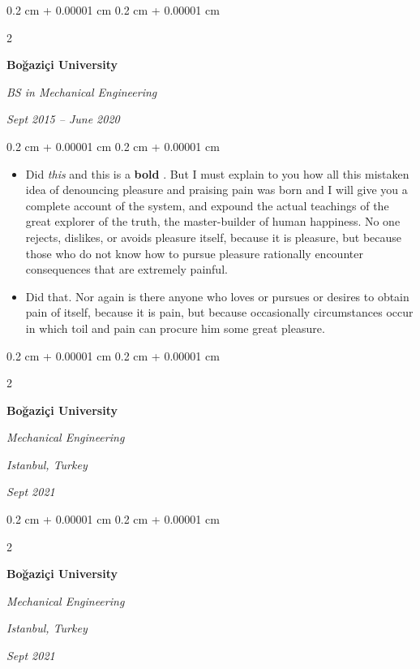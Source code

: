 \documentclass[10pt, letterpaper]{article}
\newenvironment{highlights}{
    \begin{itemize}[
        topsep=0.10 cm,
        parsep=0.10 cm,
        partopsep=0pt,
        itemsep=0pt,
        leftmargin=0.4 cm + 10pt
    ]
}{
    \end{itemize}
} %
\newenvironment{onecolentry}{
    \begin{adjustwidth}{
        0.2 cm + 0.00001 cm
    }{
        0.2 cm + 0.00001 cm
    }
}{
    \end{adjustwidth}
} %
\newenvironment{twocolentry}[2][]{
    \onecolentry
    \def\secondColumn{#2}
    \setcolumnwidth{\fill, 4.5 cm}
    \begin{paracol}{2}
}{
    \switchcolumn \raggedleft \secondColumn
    \end{paracol}
    \endonecolentry
} %
\let\hrefWithoutArrow\href
\renewcommand{\href}[2]{\hrefWithoutArrow{#1}{\ifthenelse{\equal{#2}{}}{ }{#2 }\raisebox{.15ex}{\footnotesize \faExternalLink*}}}
\begin{document}
        \vspace{0.2 cm}

        \begin{twocolentry}{
            
            
        \textit{Sept 2015 – June 2020}}
            \textbf{Boğaziçi University}

            \textit{BS in Mechanical Engineering}
        \end{twocolentry}

        \vspace{0.10 cm}
        \begin{onecolentry}
            \begin{highlights}
                \item Did \textit{this} and this is a \textbf{bold} \href{https://example.com}{link}. But I must explain to you how all this mistaken idea of denouncing pleasure and praising pain was born and I will give you a complete account of the system, and expound the actual teachings of the great explorer of the truth, the master-builder of human happiness. No one rejects, dislikes, or avoids pleasure itself, because it is pleasure, but because those who do not know how to pursue pleasure rationally encounter consequences that are extremely painful.
                \item Did that. Nor again is there anyone who loves or pursues or desires to obtain pain of itself, because it is pain, but because occasionally circumstances occur in which toil and pain can procure him some great pleasure.
            \end{highlights}
        \end{onecolentry}


        \vspace{0.2 cm}

        \begin{twocolentry}{
        \textit{Istanbul, Turkey}    
            
        \textit{Sept 2021}}
            \textbf{Boğaziçi University}

            \textit{Mechanical Engineering}
        \end{twocolentry}



        \vspace{0.2 cm}

        \begin{twocolentry}{
        \textit{Istanbul, Turkey}    
            
        \textit{Sept 2021}}
            \textbf{Boğaziçi University}

            \textit{Mechanical Engineering}
        \end{twocolentry}
\end{document}
